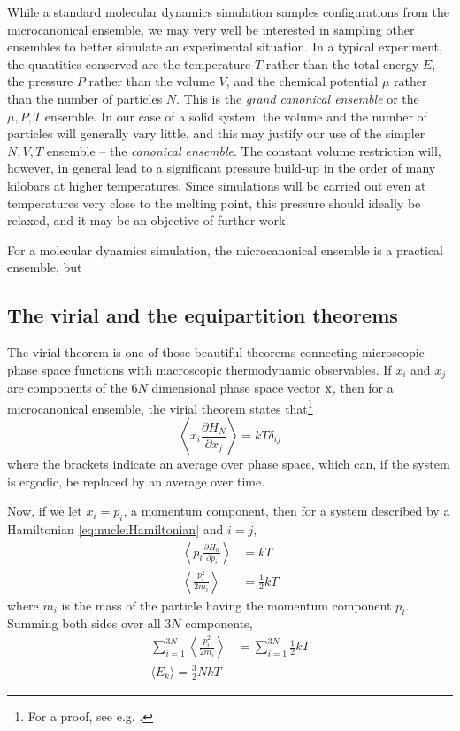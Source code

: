 \documentclass[11pt,bibliography=totoc,index=totoc]{scrbook}   %
\begin{document}
While a standard molecular dynamics simulation samples configurations from the microcanonical ensemble, we may very well be interested in sampling other ensembles to better simulate an experimental situation. 
In a typical experiment, the quantities conserved are the temperature $T$ rather than the total energy $E$, the pressure $P$ rather than the volume $V$, and the chemical potential $\mu$ rather than the number of particles $N$. 
This is the \emph{grand canonical ensemble} or the $\mu,P,T$ ensemble. 
In our case of a solid system, the volume and the number of particles will generally vary little, and this may justify our use of the simpler $N,V,T$ ensemble -- the \emph{canonical ensemble}. 
The constant volume restriction will, however, in general lead to a significant pressure build-up in the order of many kilobars at higher temperatures. 
Since simulations will be carried out even at temperatures very close to the melting point, this pressure should ideally be relaxed, and it may be an objective of further work.





For a molecular dynamics simulation, the microcanonical ensemble is a practical ensemble, but  

%
\subsection{The virial and the equipartition theorems}
%

The virial theorem is one of those beautiful theorems connecting microscopic phase space functions with macroscopic thermodynamic observables. 
If $x_i$ and $x_j$ are components of the $6N$ dimensional phase space vector $\mathrm{x}$, 
then for a microcanonical ensemble, the virial theorem states that\footnote{For a proof, see e.g. \cite[81]{Tuckerman:2010}.}
\begin{equation}
  \left\langle x_i \frac{\partial H_N}{\partial x_j}\right\rangle = kT \delta_{ij}
\end{equation}
where the brackets indicate an average over phase space, which can, if the system is ergodic, be replaced by an average over time.

Now, if we let $x_i = p_i$, a momentum component, then for a system described by a Hamiltonian \eqref{eq:nucleiHamiltonian} and $i=j$,
\begin{align}
  \left\langle p_i \frac{\partial H_n}{\partial p_i}\right\rangle &= kT  \\
  \left\langle \frac{p_i^2}{2m_i}\right\rangle &= \frac12kT
\end{align}
where $m_i$ is the mass of the particle having the momentum component $p_i$. 
Summing both sides over all $3N$ components, 
\begin{align}
  \sum_{i=1}^{3N} \left\langle\frac{p_i^2}{2m_i} \right\rangle &= \sum_{i=1}^{3N} \frac12 kT \\
  \langle E_k \rangle = \frac32 NkT
\end{align}
\end{document}
